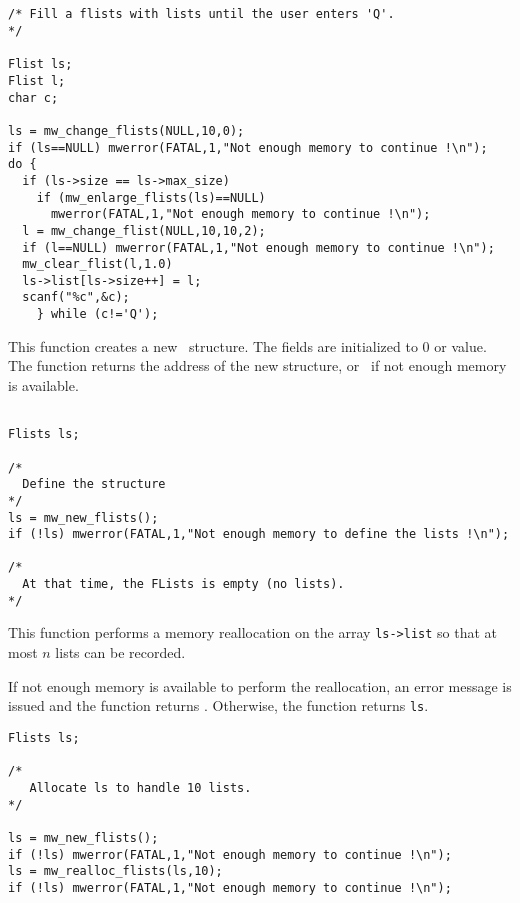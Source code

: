\Next
\Example
\begin{verbatim}


/* Fill a flists with lists until the user enters 'Q'.
*/

Flist ls; 
Flist l;
char c;

ls = mw_change_flists(NULL,10,0);
if (ls==NULL) mwerror(FATAL,1,"Not enough memory to continue !\n");
do {
  if (ls->size == ls->max_size) 
    if (mw_enlarge_flists(ls)==NULL)
      mwerror(FATAL,1,"Not enough memory to continue !\n");
  l = mw_change_flist(NULL,10,10,2);
  if (l==NULL) mwerror(FATAL,1,"Not enough memory to continue !\n");
  mw_clear_flist(l,1.0)
  ls->list[ls->size++] = l;
  scanf("%c",&c);
    } while (c!='Q');
\end{verbatim}

\newpage %


\Description
This function creates a new \flists\ structure. The fields are initialized
to $0$ or \Null value.
The function returns the address of the new structure, or
\Null\ if not enough memory is available.

\Next
\Example
\begin{verbatim}

Flists ls;

/*
  Define the structure
*/
ls = mw_new_flists();
if (!ls) mwerror(FATAL,1,"Not enough memory to define the lists !\n");

/* 
  At that time, the FLists is empty (no lists).
*/
\end{verbatim}

\newpage %


\Description
This function performs a memory reallocation on the array
\verb+ls->list+ so that at most $n$ lists can be recorded.

If not enough memory is available to perform the reallocation, an error
message is issued and the function returns \Null.
Otherwise, the function returns \verb+ls+.

\Next
\Example
\begin{verbatim}
Flists ls;

/*
   Allocate ls to handle 10 lists.
*/

ls = mw_new_flists();
if (!ls) mwerror(FATAL,1,"Not enough memory to continue !\n");
ls = mw_realloc_flists(ls,10);
if (!ls) mwerror(FATAL,1,"Not enough memory to continue !\n");

\end{verbatim}

\newpage %


